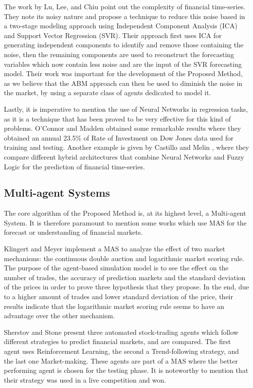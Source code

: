 \documentclass[12pt,journal,draftcls,onecolumn]{IEEEtran}
\begin{document}
The work by Lu, Lee, and Chiu \cite{Lu2009} point out the complexity
of financial time-series. They note its noisy nature and propose a
technique to reduce this noise based in a two-stage modeling approach
using Independent Component Analysis (ICA) and Support Vector
Regression (SVR). Their approach first uses ICA for generating
independent components to identify and remove those containing the
noise, then the remaining components are used to reconstruct the
forecasting variables which now contain less noise and are the input
of the SVR forecasting model. Their work was important for the
development of the Proposed Method, as we believe that the ABM
approach can then be used to diminish the noise in the market, by
using a separate class of agents dedicated to model it.

Lastly, it is imperative to mention the use of Neural Networks in
regression tasks, as it is a technique that has been proved to be very
effective for this kind of problems. O'Connor and Madden
\cite{Connor2005} obtained some remarkable results where they obtained
an annual 23.5\% of Rate of Investment on Dow Jones data used for
training and testing. Another example is given by Castillo and Melin
\cite{castillo2001simulation}, where they compare different hybrid
architectures that combine Neural Networks and Fuzzy Logic for the
prediction of financial time-series.

\subsection{Multi-agent Systems}
\label{multi-agent-systems}

The core algorithm of the Proposed Method is, at its highest level, a Multi-agent System. It is therefore paramount to mention some works which use MAS for the forecast or understanding of financial markets.

Klingert and Meyer \cite{Klingert_2012} implement a MAS to analyze the effect of two market mechanisms: the continuous double auction and logarithmic market scoring rule. The purpose of the agent-based simulation model is to see the effect on the number of trades, the accuracy of prediction markets and the standard deviation of the prices in order to prove three hypothesis that they propose. In the end, due to a higher amount of trades and lower standard deviation of the price, their results indicate that the logarithmic market scoring rule seems to have an advantage over the other mechanism.

Sherstov and Stone \cite{Sherstov2005} present three automated stock-trading agents which follow different strategies to predict financial markets, and are compared. The first agent uses Reinforcement Learning, the second a Trend-following strategy, and the last one Market-making. These agents are part of a MAS where the better performing agent is chosen for the testing phase. It is noteworthy to mention that their strategy was used in a live competition and won.
\end{document}
